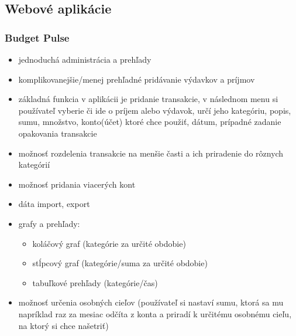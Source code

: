 \documentclass[12pt,onesided]{book}
\begin{document}
\subsection{Webové aplikácie}
\subsubsection{Budget Pulse \cite{BudgetPulse}\ }
\begin{itemize}
\item{jednoduchá administrácia a prehľady}
\item{komplikovanejšie/menej prehľadné pridávanie výdavkov a príjmov}
\item{základná funkcia v aplikácii je pridanie transakcie, v následnom menu si používateľ vyberie či ide o príjem alebo výdavok, určí jeho kategóriu, popis, sumu, množstvo, konto(účet) ktoré chce použiť, dátum, prípadné zadanie opakovania transakcie}
\item{možnosť rozdelenia transakcie na menšie časti a ich priradenie do rôznych kategórií}
\item{možnosť pridania viacerých kont}
\item{dáta import, export}
\item{grafy a prehľady:}
\begin{itemize}
\item{koláčový graf (kategórie za určité obdobie)}
\item{stĺpcový graf (kategórie/suma za určité obdobie)}
\item{tabuľkové prehľady (kategórie/čas)}
\end{itemize}
\item{možnosť určenia osobných cieľov (používateľ si nastaví sumu, ktorá sa mu napríklad raz za mesiac odčíta z konta a priradí k určitému osobnému cieľu, na ktorý si chce našetriť)}
\end{itemize}
\end{document}
